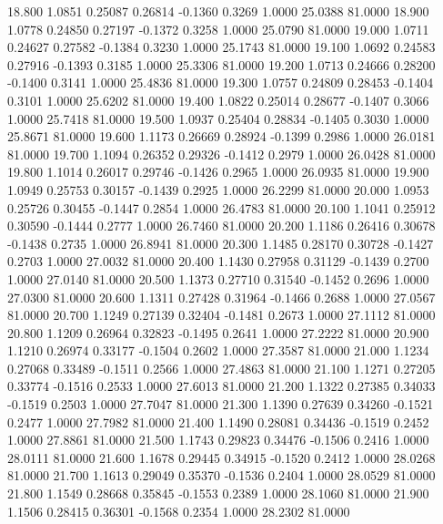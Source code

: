   18.800   1.0851   0.25087   0.26814  -0.1360   0.3269   1.0000  25.0388  81.0000
  18.900   1.0778   0.24850   0.27197  -0.1372   0.3258   1.0000  25.0790  81.0000
  19.000   1.0711   0.24627   0.27582  -0.1384   0.3230   1.0000  25.1743  81.0000
  19.100   1.0692   0.24583   0.27916  -0.1393   0.3185   1.0000  25.3306  81.0000
  19.200   1.0713   0.24666   0.28200  -0.1400   0.3141   1.0000  25.4836  81.0000
  19.300   1.0757   0.24809   0.28453  -0.1404   0.3101   1.0000  25.6202  81.0000
  19.400   1.0822   0.25014   0.28677  -0.1407   0.3066   1.0000  25.7418  81.0000
  19.500   1.0937   0.25404   0.28834  -0.1405   0.3030   1.0000  25.8671  81.0000
  19.600   1.1173   0.26669   0.28924  -0.1399   0.2986   1.0000  26.0181  81.0000
  19.700   1.1094   0.26352   0.29326  -0.1412   0.2979   1.0000  26.0428  81.0000
  19.800   1.1014   0.26017   0.29746  -0.1426   0.2965   1.0000  26.0935  81.0000
  19.900   1.0949   0.25753   0.30157  -0.1439   0.2925   1.0000  26.2299  81.0000
  20.000   1.0953   0.25726   0.30455  -0.1447   0.2854   1.0000  26.4783  81.0000
  20.100   1.1041   0.25912   0.30590  -0.1444   0.2777   1.0000  26.7460  81.0000
  20.200   1.1186   0.26416   0.30678  -0.1438   0.2735   1.0000  26.8941  81.0000
  20.300   1.1485   0.28170   0.30728  -0.1427   0.2703   1.0000  27.0032  81.0000
  20.400   1.1430   0.27958   0.31129  -0.1439   0.2700   1.0000  27.0140  81.0000
  20.500   1.1373   0.27710   0.31540  -0.1452   0.2696   1.0000  27.0300  81.0000
  20.600   1.1311   0.27428   0.31964  -0.1466   0.2688   1.0000  27.0567  81.0000
  20.700   1.1249   0.27139   0.32404  -0.1481   0.2673   1.0000  27.1112  81.0000
  20.800   1.1209   0.26964   0.32823  -0.1495   0.2641   1.0000  27.2222  81.0000
  20.900   1.1210   0.26974   0.33177  -0.1504   0.2602   1.0000  27.3587  81.0000
  21.000   1.1234   0.27068   0.33489  -0.1511   0.2566   1.0000  27.4863  81.0000
  21.100   1.1271   0.27205   0.33774  -0.1516   0.2533   1.0000  27.6013  81.0000
  21.200   1.1322   0.27385   0.34033  -0.1519   0.2503   1.0000  27.7047  81.0000
  21.300   1.1390   0.27639   0.34260  -0.1521   0.2477   1.0000  27.7982  81.0000
  21.400   1.1490   0.28081   0.34436  -0.1519   0.2452   1.0000  27.8861  81.0000
  21.500   1.1743   0.29823   0.34476  -0.1506   0.2416   1.0000  28.0111  81.0000
  21.600   1.1678   0.29445   0.34915  -0.1520   0.2412   1.0000  28.0268  81.0000
  21.700   1.1613   0.29049   0.35370  -0.1536   0.2404   1.0000  28.0529  81.0000
  21.800   1.1549   0.28668   0.35845  -0.1553   0.2389   1.0000  28.1060  81.0000
  21.900   1.1506   0.28415   0.36301  -0.1568   0.2354   1.0000  28.2302  81.0000
